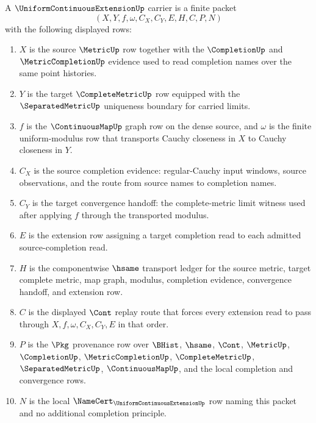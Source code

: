 \begin{definition}
\label{def:uniform-continuous-extension-carrier}
A $\UniformContinuousExtensionUp$ carrier is a finite packet
$$
(X,Y,f,\omega,C_X,C_Y,E,H,C,P,N)
$$
with the following displayed rows:
\begin{enumerate}
\item $X$ is the source $\MetricUp$ row together with the $\CompletionUp$ and $\MetricCompletionUp$ evidence used to read completion names over the same point histories.
\item $Y$ is the target $\CompleteMetricUp$ row equipped with the $\SeparatedMetricUp$ uniqueness boundary for carried limits.
\item $f$ is the $\ContinuousMapUp$ graph row on the dense source, and $\omega$ is the finite uniform-modulus row that transports Cauchy closeness in $X$ to Cauchy closeness in $Y$.
\item $C_X$ is the source completion evidence: regular-Cauchy input windows, source observations, and the route from source names to completion names.
\item $C_Y$ is the target convergence handoff: the complete-metric limit witness used after applying $f$ through the transported modulus.
\item $E$ is the extension row assigning a target completion read to each admitted source-completion read.
\item $H$ is the componentwise $\hsame$ transport ledger for the source metric, target complete metric, map graph, modulus, completion evidence, convergence handoff, and extension row.
\item $C$ is the displayed $\Cont$ replay route that forces every extension read to pass through $X,f,\omega,C_X,C_Y,E$ in that order.
\item $P$ is the $\Pkg$ provenance row over $\BHist$, $\hsame$, $\Cont$, $\MetricUp$, $\CompletionUp$, $\MetricCompletionUp$, $\CompleteMetricUp$, $\SeparatedMetricUp$, $\ContinuousMapUp$, and the local completion and convergence rows.
\item $N$ is the local $\NameCert_{\UniformContinuousExtensionUp}$ row naming this packet and no additional completion principle.
\end{enumerate}
\end{definition}

